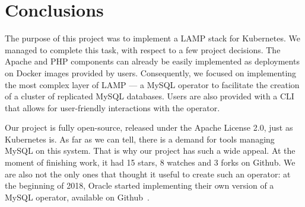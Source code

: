 \section{Conclusions}
The purpose of this project was to implement a LAMP stack for Kubernetes. We managed to complete
this task, with respect to a few project decisions. The Apache and PHP
components can already be easily implemented as
deployments on Docker images provided by users. Consequently, we focused on implementing the most
complex layer of LAMP --- a MySQL operator to facilitate the creation of a cluster of replicated
MySQL databases. Users are also provided with a CLI that allows for user-friendly interactions with
the operator.

Our project is fully open-source, released under the Apache License 2.0, just as Kubernetes is. As
far as we can tell, there is a demand for tools managing MySQL on this system. That is why our
project has such a wide appeal. At the moment of finishing work, it had 15 stars, 8 watches and 3
forks on Github. We are also not the only ones that thought it useful to create
such an operator: at the beginning of 2018, Oracle started implementing their
own version of a MySQL operator, available on Github~\cite{oracle}.
